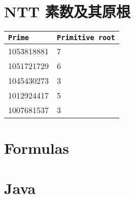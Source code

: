 \section{NTT 素数及其原根}
\begin{tabular}{|l|l|}
	\hline
	\texttt{Prime} & \texttt{Primitive root} \\
	\hline
	1053818881 & 7 \\
	\hline
	1051721729 & 6 \\
	\hline
	1045430273 & 3 \\
	\hline
	1012924417 & 5 \\
	\hline
	1007681537 & 3 \\
	\hline
\end{tabular}

\section{Formulas}



\section{Java}
\inputminted{java}{\source/hints/template.java}

